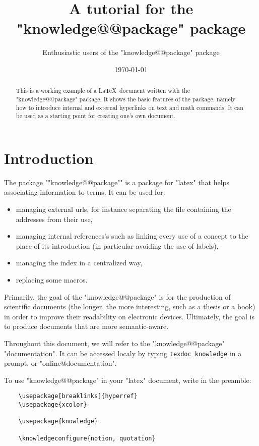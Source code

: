 \documentclass{article}
\title{A tutorial for the "knowledge@@package" package}
\author{Enthusiastic users of the "knowledge@@package" package}
\date{\today}
\begin{document}
\maketitle

\begin{abstract}
    This is a working example of a \LaTeX~document written with the 
    "knowledge@@package" package.
    It shows the basic features of the package, namely how 
    to introduce internal and external hyperlinks on text and math commands. It 
    can be used as a starting point for creating one's own document.
\end{abstract}

\tableofcontents

\section{Introduction}

The package \AP""knowledge@@package"" is a package for "latex" that helps associating 
information to terms. It can be used for:
\begin{itemize}
    \item managing external urls, for instance separating the file containing   
        the addresses from their use,
    \item managing internal references's such as linking every use of a concept 
        to the place of its introduction
        (in particular avoiding the use of labels),
    \item managing the index in a centralized way,
    \item replacing some macros.
\end{itemize}

Primarily, the goal of the "knowledge@@package" is for the production of scientific documents (the longer, the more interesting, such as a thesis or a book) in order to improve their readability on electronic devices. Ultimately, the goal is to produce documents that are more semantic-aware.

Throughout this document, we will refer to the "knowledge@@package" 
"documentation". It can be accessed localy by typing \verb|texdoc knowledge| in 
a prompt, or "online@documentation".

To use "knowledge@@package" in your "latex" document, write in the preamble:
\begin{verbatim}
    \usepackage[breaklinks]{hyperref} 
    \usepackage{xcolor} 

    \usepackage{knowledge}

    \knowledgeconfigure{notion, quotation}
\end{verbatim}
\end{document}
